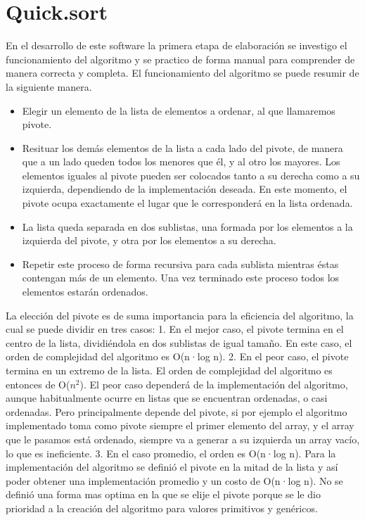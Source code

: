 \documentclass[12pt,letterpaper]{article}
\begin{document}
\section{Quick.sort}
\vskip 0.4cm
En el desarrollo de este software la primera etapa de elaboración se investigo el funcionamiento del algoritmo y se practico de forma manual para comprender de manera correcta y completa.
\vskip 0.4cm
El funcionamiento del algoritmo se puede resumir de la siguiente manera.
\vskip 0.4cm
\begin{itemize}
\item Elegir un elemento de la lista de elementos a ordenar, al que llamaremos pivote.
\item	Resituar los demás elementos de la lista a cada lado del pivote, de manera que a un lado queden todos los menores que él, y al otro los mayores. Los elementos iguales al pivote pueden ser colocados tanto a su derecha como a su izquierda, dependiendo de la implementación deseada. En este momento, el pivote ocupa exactamente el lugar que le corresponderá en la lista ordenada.
\item La lista queda separada en dos sublistas, una formada por los elementos a la izquierda del pivote, y otra por los elementos a su derecha.
\item Repetir este proceso de forma recursiva para cada sublista mientras éstas contengan más de un elemento. Una vez terminado este proceso todos los elementos estarán ordenados.
\end{itemize}
\vskip 0.4cm
La elección del pivote es de suma importancia para la eficiencia del algoritmo, la cual se puede dividir en tres casos:
\vskip 0.4cm
1.	En el mejor caso, el pivote termina en el centro de la lista, dividiéndola en dos sublistas de igual tamaño. En este caso, el orden de complejidad del algoritmo es O(n·log n).
\vskip 0.4cm
2.	En el peor caso, el pivote termina en un extremo de la lista. El orden de complejidad del algoritmo es entonces de O($n^2$). El peor caso dependerá de la implementación del algoritmo, aunque habitualmente ocurre en listas que se encuentran ordenadas, o casi ordenadas. Pero principalmente depende del pivote, si por ejemplo el algoritmo implementado toma como pivote siempre el primer elemento del array, y el array que le pasamos está ordenado, siempre va a generar a su izquierda un array vacío, lo que es ineficiente.
\vskip 0.4cm
3.	En el caso promedio, el orden es O(n·log n).
\vskip 0.4cm
Para la implementación del algoritmo se definió el pivote en la mitad de la lista y así poder obtener una implementación promedio y un costo de O(n·log n). No se definió una forma mas optima en la que se elije el pivote porque se le dio prioridad a la creación del algoritmo para valores primitivos y genéricos.
\end{document}
